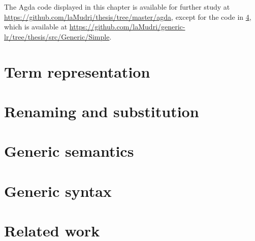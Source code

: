 The Agda code displayed in this chapter is available for further study at
\url{https://github.com/laMudri/thesis/tree/master/agda}, except for the code
in \cref{sec:gen-syn}, which is available at
\url{https://github.com/laMudri/generic-lr/tree/thesis/src/Generic/Simple}.


\section{Term representation}\label{sec:terms}

\section{Renaming and substitution}\label{sec:kits}

\section{Generic semantics}\label{sec:gen-sem}

\section{Generic syntax}\label{sec:gen-syn}

%
\section{Related work}\label{sec:mech-related}

